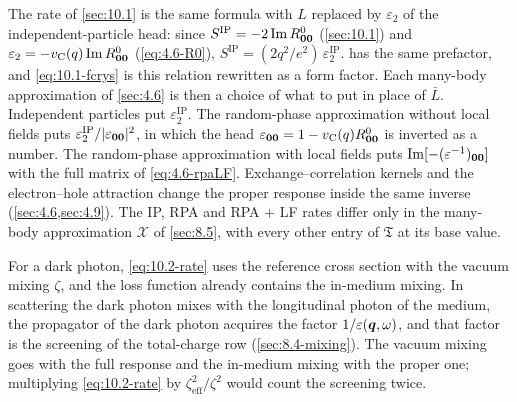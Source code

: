 The rate of \cref{sec:10.1} is the same formula with $L$ replaced by $\varepsilon_2$ of the independent-particle head: since $S^{\mathrm{IP}} = -2\operatorname{Im} R^0_{\bm{0}\bm{0}}$ (\cref{sec:10.1}) and $\varepsilon_2 = -v_{\mathrm{C}}(q)\operatorname{Im} R^0_{\bm{0}\bm{0}}$ (\cref{eq:4.6-R0}), $S^{\mathrm{IP}} = (2q^2/e^2)\,\varepsilon_2^{\mathrm{IP}}$.  has the same prefactor, and \cref{eq:10.1-fcrys} is this relation rewritten as a form factor. Each many-body approximation of \cref{sec:4.6} is then a choice of what to put in place of $\bar L$. Independent particles put $\varepsilon_2^{\mathrm{IP}}$. The random-phase approximation without local fields puts $\varepsilon_2^{\mathrm{IP}}/|\varepsilon_{\bm{0}\bm{0}}|^2$, in which the head $\varepsilon_{\bm{0}\bm{0}} = 1 - v_{\mathrm{C}}(q)R^0_{\bm{0}\bm{0}}$ is inverted as a number. The random-phase approximation with local fields puts $\operatorname{Im}[-(\varepsilon^{-1})_{\bm{0}\bm{0}}]$ with the full matrix of \cref{eq:4.6-rpaLF}. Exchange--correlation kernels and the electron--hole attraction change the proper response inside the same inverse (\cref{sec:4.6,sec:4.9}). The IP, RPA and RPA + LF rates differ only in the many-body approximation $\mathcal{X}$ of \cref{sec:8.5}, with every other entry of $\mathfrak{T}$ at its base value.

For a dark photon, \cref{eq:10.2-rate} uses the reference cross section with the vacuum mixing $\zeta$, and the loss function already contains the in-medium mixing. In scattering the dark photon mixes with the longitudinal photon of the medium, the propagator of the dark photon acquires the factor $1/\varepsilon(\bm{q},\omega)$, and that factor is the screening of the total-charge row (\cref{sec:8.4-mixing}). The vacuum mixing goes with the full response and the in-medium mixing with the proper one; multiplying \cref{eq:10.2-rate} by $\zeta_{\mathrm{eff}}^2/\zeta^2$ would count the screening twice.

